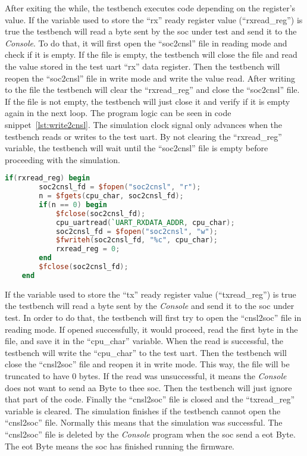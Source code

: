 After exiting the while, the testbench executes code depending on the register's value. If the variable used to store the \enquote{rx} ready register value (\enquote{rxread\_reg}) is true the testbench will read a byte sent by the \acrshort{soc} under test and send it to the \textit{Console}. To do that, it will first open the \enquote{soc2cnsl} file in reading mode and check if it is empty. If the file is empty, the testbench will close the file and read the value stored in the test \acrshort{uart} \enquote{rx} data register. Then the testbench will reopen the \enquote{soc2cnsl} file in write mode and write the value read. After writing to the file the testbench will clear the \enquote{rxread\_reg} and close the \enquote{soc2cnsl} file. If the file is not empty, the testbench will just close it and verify if it is empty again in the next loop. The program logic can be seen in code snippet~\ref{lst:write2cnsl}. The simulation clock signal only advances when the testbench reads or writes to the test \acrshort{uart}. By not clearing the \enquote{rxread\_reg} variable, the testbench will wait until the \enquote{soc2cnsl} file is empty before proceeding with the simulation.

\begin{lstlisting}[language=Verilog, caption={Write byte from \acrshort{soc} to \textit{Console}.}, label=lst:write2cnsl]
    if(rxread_reg) begin
        soc2cnsl_fd = $fopen("soc2cnsl", "r");
        n = $fgets(cpu_char, soc2cnsl_fd);
        if(n == 0) begin
            $fclose(soc2cnsl_fd);
            cpu_uartread(`UART_RXDATA_ADDR, cpu_char);
            soc2cnsl_fd = $fopen("soc2cnsl", "w");
            $fwriteh(soc2cnsl_fd, "%c", cpu_char);
            rxread_reg = 0;
        end
        $fclose(soc2cnsl_fd);
    end
\end{lstlisting}

If the variable used to store the \enquote{tx} ready register value (\enquote{txread\_reg}) is true the testbench will read a byte sent by the \textit{Console} and send it to the \acrshort{soc} under test. In order to do that, the testbench will first try to open the \enquote{cnsl2soc} file in reading mode. If opened successfully, it would proceed, read the first byte in the file, and save it in the \enquote{cpu\_char} variable. When the read is successful, the testbench will write the \enquote{cpu\_char} to the test \acrshort{uart}. Then the testbench will close the \enquote{cnsl2soc} file and reopen it in write mode. This way, the file will be truncated to have 0 bytes. If the read was unsuccessful, it means the \textit{Console} does not want to send aa Byte to thee \acrshort{soc}. Then the testbench will just ignore that part of the code. Finally the \enquote{cnsl2soc} file is closed and the \enquote{txread\_reg} variable is cleared. The simulation finishes if the testbench cannot open the \enquote{cnsl2soc} file. Normally this means that the simulation was successful. The \enquote{cnsl2soc} file is deleted by the \textit{Console} program when the \acrshort{soc} send a \acrfull{eot} Byte. The \acrshort{eot} Byte means the \acrshort{soc} has finished running the firmware.

